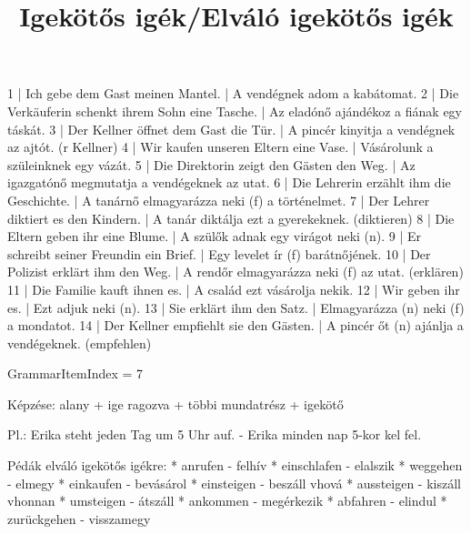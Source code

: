 \begin{exmp}
1 | Ich gebe dem Gast meinen Mantel. | A vendégnek adom a kabátomat.
2 | Die Verkäuferin schenkt ihrem Sohn eine Tasche. | Az eladónő ajándékoz a fiának egy táskát.
3 | Der Kellner öffnet dem Gast die Tür. | A pincér kinyitja a vendégnek az ajtót. (r Kellner)
4 | Wir kaufen unseren Eltern eine Vase. | Vásárolunk a szüleinknek egy vázát.
5 | Die Direktorin zeigt den Gästen den Weg. | Az igazgatónő megmutatja a vendégeknek az utat.
6 | Die Lehrerin erzählt ihm die Geschichte. | A tanárnő elmagyarázza neki (f) a történelmet.
7 | Der Lehrer diktiert es den Kindern. | A tanár diktálja ezt a gyerekeknek. (diktieren)
8 | Die Eltern geben ihr eine Blume. | A szülők adnak egy virágot neki (n).
9 | Er schreibt seiner Freundin ein Brief. | Egy levelet ír (f) barátnőjének.
10 | Der Polizist erklärt ihm den Weg. | A rendőr elmagyarázza neki (f) az utat. (erklären)
11 | Die Familie kauft ihnen es. | A család ezt vásárolja nekik.
12 | Wir geben ihr es. | Ezt adjuk neki (n).
13 | Sie erklärt ihm den Satz. | Elmagyarázza (n) neki (f) a mondatot.
14 | Der Kellner empfiehlt sie den Gästen. | A pincér őt (n) ajánlja a vendégeknek. (empfehlen)
\end{exmp}

\title{Igekötős igék/Elváló igekötős igék}

GrammarItemIndex = 7

\begin{desc}
Képzése: alany + ige ragozva + többi mundatrész + igekötő

Pl.: Erika steht jeden Tag um 5 Uhr auf. - Erika minden nap 5-kor kel fel.

Pédák elváló igekötős igékre:
* anrufen - felhív
* einschlafen - elalszik
* weggehen - elmegy
* einkaufen - bevásárol
* einsteigen - beszáll vhová
* aussteigen - kiszáll vhonnan
* umsteigen - átszáll
* ankommen - megérkezik
* abfahren - elindul
* zurückgehen - visszamegy
\end{desc}

